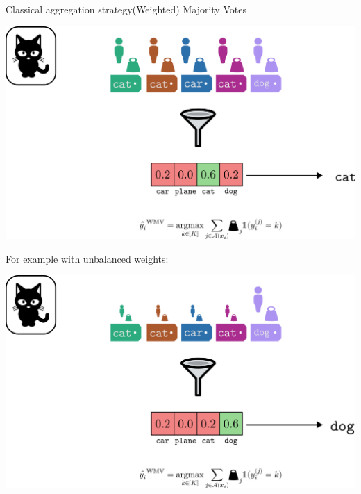 \begin{frame}{Classical aggregation strategy}{(Weighted) Majority Votes}
    \begin{center}
        \includegraphics[width=.8\textwidth, clip, trim={50cm 0cm 30cm 80cm}]{./images/MV_label.pdf}
    \end{center}

        For example with unbalanced weights:

    \begin{center}
        \includegraphics[width=\textwidth, clip, trim={0cm 10cm 0cm 0cm}]{./images/MV_label_unbalanced.pdf}
    \end{center}

\end{frame}


